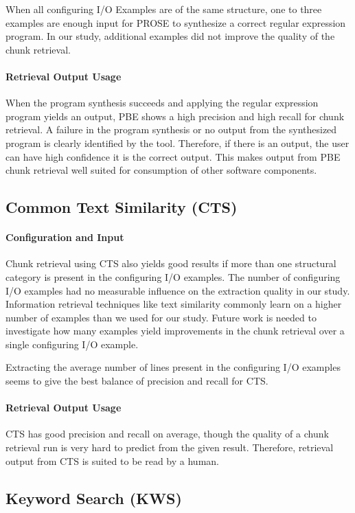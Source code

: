 \documentclass[\myrootdir/main.tex]{subfiles}
\begin{document}
When all configuring I/O Examples are of the same structure, one to three examples are enough input for PROSE to synthesize a correct regular expression program.
In our study, additional examples did not improve the quality of the chunk retrieval.

\paragraph{Retrieval Output Usage}
When the program synthesis succeeds and applying the regular expression program yields an output, PBE shows a high precision and high recall for chunk retrieval.
A failure in the program synthesis or no output from the synthesized program is clearly identified by the tool.
Therefore, if there is an output, the user can have high confidence it is the correct output.
This makes output from PBE chunk retrieval well suited for consumption of other software components.

\subsection{Common Text Similarity (CTS)}
\paragraph{Configuration and Input}
Chunk retrieval using CTS also yields good results if more than one structural category is present in the configuring I/O examples.
The number of configuring I/O examples had no measurable influence on the extraction quality in our study.
Information retrieval techniques like text similarity commonly learn on a higher number of examples than we used for our study.
Future work is needed to investigate how many examples yield improvements in the chunk retrieval over a single configuring I/O example.

Extracting the average number of lines present in the configuring I/O examples seems to give the best balance of precision and recall for CTS\@.

\paragraph{Retrieval Output Usage}
CTS has good precision and recall on average, though the quality of a chunk retrieval run is very hard to predict from the given result.
Therefore, retrieval output from CTS is suited to be read by a human.

\subsection{Keyword Search (KWS)}
\end{document}
